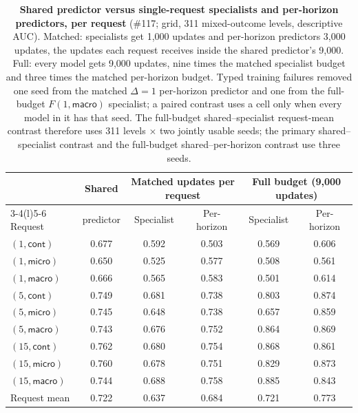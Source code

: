 \begin{table}[h]
\begin{revblock}
\centering
\footnotesize
\caption{\textbf{Shared predictor versus single-request specialists and per-horizon predictors, per request} (\#117; grid, 311 mixed-outcome levels, descriptive AUC). Matched: specialists get 1,000 updates and per-horizon predictors 3,000 updates, the updates each request receives inside the shared predictor's 9,000. Full: every model gets 9,000 updates, nine times the matched specialist budget and three times the matched per-horizon budget. Typed training failures removed one seed from the matched $\Delta=1$ per-horizon predictor and one from the full-budget $F(1,\textsf{macro})$ specialist; a paired contrast uses a cell only when every model in it has that seed. The full-budget shared--specialist request-mean contrast therefore uses 311 levels $\times$ two jointly usable seeds; the primary shared--specialist contrast and the full-budget shared--per-horizon contrast use three seeds.}
\label{tab:app:res:sharing}
\begin{tabular}{@{}lccccc@{}}
\toprule
& Shared & \multicolumn{2}{c}{Matched updates per request} & \multicolumn{2}{c}{Full budget (9,000 updates)} \\
\cmidrule(lr){3-4}\cmidrule(l){5-6}
Request & predictor & Specialist & Per-horizon & Specialist & Per-horizon \\
\midrule
$(1,\textsf{cont})$ & 0.677 & 0.592 & 0.503 & 0.569 & 0.606 \\
$(1,\textsf{micro})$ & 0.650 & 0.525 & 0.577 & 0.508 & 0.561 \\
$(1,\textsf{macro})$ & 0.666 & 0.565 & 0.583 & 0.501 & 0.614 \\
$(5,\textsf{cont})$ & 0.749 & 0.681 & 0.738 & 0.803 & 0.874 \\
$(5,\textsf{micro})$ & 0.745 & 0.648 & 0.738 & 0.657 & 0.859 \\
$(5,\textsf{macro})$ & 0.743 & 0.676 & 0.752 & 0.864 & 0.869 \\
$(15,\textsf{cont})$ & 0.762 & 0.680 & 0.754 & 0.868 & 0.861 \\
$(15,\textsf{micro})$ & 0.760 & 0.678 & 0.751 & 0.829 & 0.873 \\
$(15,\textsf{macro})$ & 0.744 & 0.688 & 0.758 & 0.885 & 0.843 \\
\midrule
Request mean & 0.722 & 0.637 & 0.684 & 0.721 & 0.773 \\
\bottomrule
\end{tabular}
\end{revblock}
\end{table}

